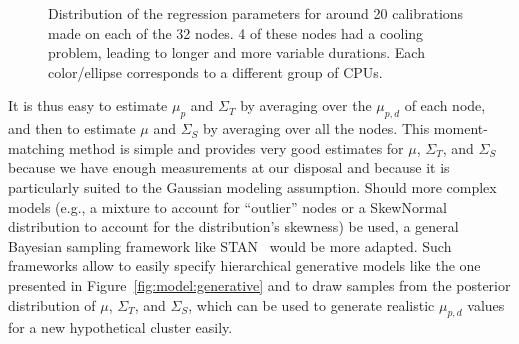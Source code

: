 \begin{figure}[htpb]
                \caption{Distribution of the regression parameters for around 20
                    \dgemm calibrations made on each of the 32 nodes. 4 of
                    these nodes had a cooling problem, leading to longer and more
                    variable durations. Each
                    color/ellipse corresponds to a different group of CPUs.}
                \label{fig:whatif_slow}
            \end{figure}

            It is thus easy to estimate \(\mu_{p}\) and \(\Sigma_T\) by averaging over the \(\mu_{p,d}\) of each node,
            and then to estimate \(\mu\) and \(\Sigma_S\) by averaging over all the nodes. This moment-matching method
            is simple and provides very good estimates for \(\mu\), \(\Sigma_T\), and \(\Sigma_S\) because we have
            enough measurements at our disposal and because it is particularly suited to the Gaussian modeling
            assumption. Should more complex models (e.g., a mixture to account for ``outlier'' nodes or a SkewNormal
            distribution to account for the distribution's skewness) be used, a general Bayesian sampling framework like
            STAN~\cite{stan} would be more adapted. Such frameworks allow to easily specify hierarchical generative
            models like the one presented in Figure~\ref{fig:model:generative} and to draw samples from the posterior
            distribution of \(\mu\), \(\Sigma_T\), and \(\Sigma_S\), which can be used to generate realistic
            \(\mu_{p,d}\) values for a new hypothetical cluster easily.

